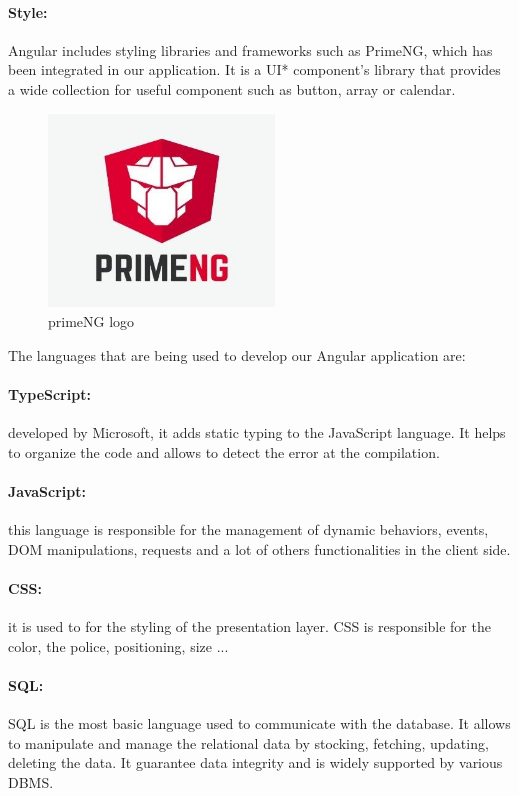 \documentclass[12pt,a4paper,table,english]{article}
\begin{document}
	\paragraph{Style:}
	Angular includes styling libraries and frameworks such as PrimeNG, which has been integrated in our application. It is a UI* component's library that provides a wide collection for useful component such as button, array or calendar.\\
	
	\begin{figure}[H]
		\centering
		\includegraphics[width=60mm]{Image/primeNG}
		\caption{primeNG logo}
		\label{fig:primeNG logo}
	\end{figure}
	
	\noindent The languages that are being used to develop our Angular application are:
	
	\paragraph{TypeScript:} developed by Microsoft, it adds static typing to the JavaScript language. It helps to organize the code and allows to detect the error at the compilation.
	
	\paragraph{JavaScript:} this language is responsible for the management of dynamic behaviors, events, DOM manipulations, requests and a lot of others functionalities in the client side.
	
	\paragraph{CSS:} it is used to for the styling of the presentation layer. CSS is responsible for the color, the police, positioning, size ...
	
	\paragraph{SQL:} SQL is the most basic language used to communicate with the database. It allows to manipulate and manage the relational data by stocking, fetching, updating, deleting the data. It guarantee data integrity and is widely supported by various DBMS.
	
\end{document}
